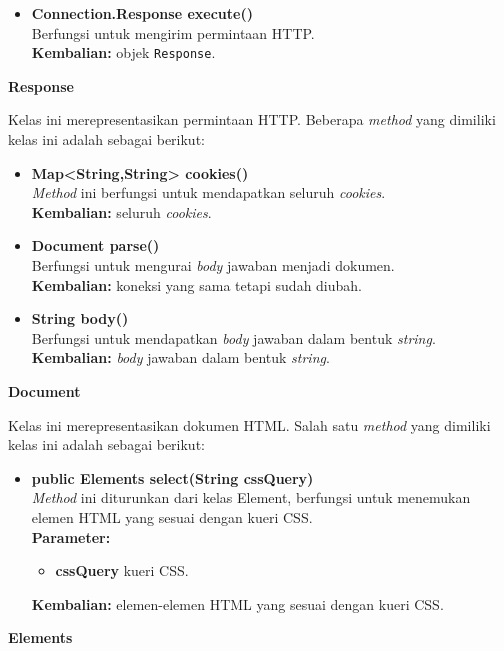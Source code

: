 \documentclass[a4paper,twoside]{article}
\begin{document}
\begin{enumerate}
\begin{enumerate}
\begin{itemize}
		\item \textbf{Connection.Response execute()} \\
		Berfungsi untuk mengirim permintaan HTTP.\\
		\textbf{Kembalian:} objek \texttt{Response}.	
\end{itemize}

\textbf{Response}

Kelas ini merepresentasikan permintaan HTTP. Beberapa \textit{method} yang dimiliki kelas ini adalah sebagai berikut:
\begin{itemize}
	\item \textbf{Map<String,String> cookies()} \\
		\textit{Method} ini berfungsi untuk mendapatkan seluruh \textit{cookies}. \\
		\textbf{Kembalian:} seluruh \textit{cookies}.	
		
		\item \textbf{Document parse()} \\
		Berfungsi untuk mengurai \textit{body} jawaban menjadi dokumen. \\
		\textbf{Kembalian:} koneksi yang sama tetapi sudah diubah.
		
		\item \textbf{String body()} \\
		Berfungsi untuk mendapatkan \textit{body} jawaban dalam bentuk \textit{string}. \\
		\textbf{Kembalian:} \textit{body} jawaban dalam bentuk \textit{string}.
\end{itemize}

\textbf{Document}

Kelas ini merepresentasikan dokumen HTML. Salah satu \textit{method} yang dimiliki kelas ini adalah sebagai berikut:
\begin{itemize}
	\item \textbf{public Elements select(String cssQuery)} \\
		\textit{Method} ini diturunkan dari kelas Element, berfungsi untuk menemukan elemen HTML yang sesuai dengan kueri CSS. \\
		\textbf{Parameter:} 
		\begin{itemize}
			\item \textbf{cssQuery} kueri CSS.
		\end{itemize}
		\textbf{Kembalian:} elemen-elemen HTML yang sesuai dengan kueri CSS.	
\end{itemize}

\textbf{Elements}


\end{enumerate}
\end{enumerate}
\end{document}
